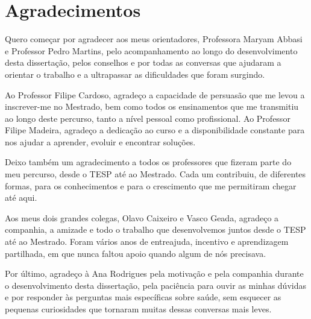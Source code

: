 
\chapter*{Agradecimentos}

Quero começar por agradecer aos meus orientadores, Professora Maryam Abbasi e Professor Pedro Martins, pelo acompanhamento ao longo do desenvolvimento desta dissertação, pelos conselhos e por todas as conversas que ajudaram a orientar o trabalho e a ultrapassar as dificuldades que foram surgindo.

Ao Professor Filipe Cardoso, agradeço a capacidade de persuasão que me levou a inscrever-me no Mestrado, bem como todos os ensinamentos que me transmitiu ao longo deste percurso, tanto a nível pessoal como profissional. Ao Professor Filipe Madeira, agradeço a dedicação ao curso e a disponibilidade constante para nos ajudar a aprender, evoluir e encontrar soluções.

Deixo também um agradecimento a todos os professores que fizeram parte do meu percurso, desde o TESP até ao Mestrado. Cada um contribuiu, de diferentes formas, para os conhecimentos e para o crescimento que me permitiram chegar até aqui.

Aos meus dois grandes colegas, Olavo Caixeiro e Vasco Geada, agradeço a companhia, a amizade e todo o trabalho que desenvolvemos juntos desde o TESP até ao Mestrado. Foram vários anos de entreajuda, incentivo e aprendizagem partilhada, em que nunca faltou apoio quando algum de nós precisava.

Por último, agradeço à Ana Rodrigues pela motivação e pela companhia durante o desenvolvimento desta dissertação, pela paciência para ouvir as minhas dúvidas e por responder às perguntas mais específicas sobre saúde, sem esquecer as pequenas curiosidades que tornaram muitas dessas conversas mais leves.
